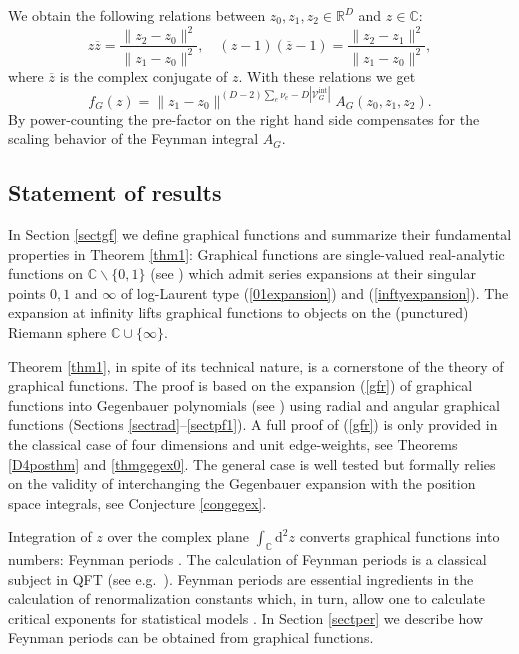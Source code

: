 \documentclass[oneside]{amsart}
\newcommand{\CC}{{\mathbb C}}
\newcommand{\RR}{{\mathbb R}}
\newcommand{\dd}{\mathrm{d}}
\newcommand{\zz}{{\overline{z}}}
\newcommand{\sV}{\mathcal{V}}
\newcommand{\sVGint}{{\sV_G^\mathrm{int}}}
\newcommand{\VGint}{{|\sVGint|}}
\theoremstyle{plain}
\begin{document}
We obtain the following relations between $z_0,z_1,z_2\in \RR^D$ and $z\in\CC$:
\begin{equation}\label{eqinvs}
z\zz =  \frac{\|z_2-z_0\|^2}{\|z_1-z_0\|^2},
\quad(z-1)(\zz-1) =\frac{\|z_2-z_1\|^2}{\|z_1-z_0\|^2},
\end{equation}
where $\zz$ is the complex conjugate of $z$. With these relations we get
\begin{equation}\label{eqfA}
f_G(z)=\|z_1-z_0\|^{(D-2)\sum_e\nu_e-D\VGint}A_G(z_0,z_1,z_2).
\end{equation}
By power-counting the pre-factor on the right hand side compensates for the scaling behavior of the Feynman integral $A_G$.

\subsection{Statement of results}
In Section \ref{sectgf} we define graphical functions and summarize their fundamental properties in Theorem \ref{thm1}: Graphical functions are single-valued real-analytic functions
on $\CC\backslash\{0,1\}$ (see \cite{par}) which admit series expansions at their singular points $0,1$ and $\infty$ of log-Laurent type (\ref{01expansion}) and (\ref{inftyexpansion}).
The expansion at infinity lifts graphical functions to objects on the (punctured) Riemann sphere $\CC\cup\{\infty\}$.

Theorem \ref{thm1}, in spite of its technical nature, is a cornerstone of the theory of graphical functions. The proof is based on the expansion (\ref{gfr}) of graphical functions
into Gegenbauer polynomials (see \cite{geg}) using radial and angular graphical functions (Sections \ref{sectrad}--\ref{sectpf1}). A full proof of (\ref{gfr}) is only provided in the
classical case of four dimensions and unit edge-weights, see Theorems \ref{D4posthm} and \ref{thmgegex0}. The general case is well tested but formally relies on the validity of
interchanging the Gegenbauer expansion with the position space integrals, see Conjecture \ref{congegex}.

Integration of $z$ over the complex plane $\int_\CC \dd^2z$ converts graphical functions into numbers: Feynman periods \cite{gf,numfunct}.
The calculation of Feynman periods is a classical subject in QFT (see e.g.\ \cite{BK,Census}).
Feynman periods are essential ingredients in the calculation of renormalization constants which, in turn, allow one to calculate critical exponents for statistical models \cite{ZJ}.
In Section \ref{sectper} we describe how Feynman periods can be obtained from graphical functions.
\end{document}
